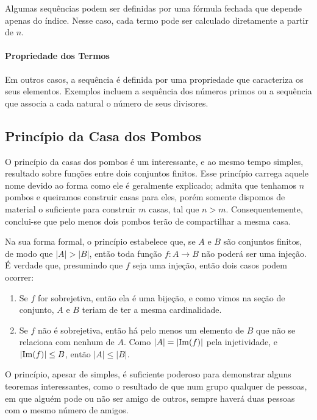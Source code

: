 Algumas sequências podem ser definidas por uma fórmula fechada que depende
apenas do índice. Nesse caso, cada termo pode ser calculado diretamente
a partir de $n$.

\paragraph{Propriedade dos Termos}

Em outros casos, a sequência é definida por uma propriedade que caracteriza
os seus elementos. Exemplos incluem a sequência dos números primos ou a
sequência que associa a cada natural o número de seus divisores.

\subsection{Princípio da Casa dos Pombos}

O princípio da casas dos pombos é um interessante, e ao mesmo tempo simples,
resultado sobre funções entre dois conjuntos finitos. Esse princípio carrega
aquele nome devido ao forma como ele é geralmente explicado; admita que tenhamos
$n$ pombos e queiramos construir casas para eles, porém somente dispomos de material
o suficiente para construir $m$ casas, tal que $n > m$. Consequentemente, conclui-se
que pelo menos dois pombos terão de compartilhar a mesma casa.

Na sua forma formal, o princípio estabelece que, se $A$ e $B$ são conjuntos
finitos, de modo que $|A| > |B|$, então toda função $f: A \to B$ não poderá
ser uma injeção. É verdade que, presumindo que $f$ seja uma injeção, então dois
casos podem ocorrer:
\begin{enumerate}
  \item Se $f$ for sobrejetiva, então ela é uma bijeção, e como vimos na seção
    de conjunto, $A$ e $B$ teriam de ter a mesma cardinalidade.

  \item Se $f$ não é sobrejetiva, então há pelo menos um elemento de $B$ que
    não se relaciona com nenhum de $A$. Como $|A| = |\mathrm{Im}(f)|$ pela injetividade,
    e $|\mathrm{Im}(f)| \leq B$, então $|A| \leq |B|$.
\end{enumerate}

O princípio, apesar de simples, é suficiente poderoso para demonstrar alguns
teoremas interessantes, como o resultado de que num grupo qualquer de pessoas,
em que alguém pode ou não ser amigo de outros, sempre haverá duas pessoas com
o mesmo número de amigos.
